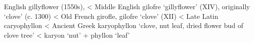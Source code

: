


\begin{etymology}
English gillyflower (1550s),
< Middle English gilofre `gillyflower' (XIV), originally `clove' (c. 1300)
< Old French girofle, gilofre `clove' (XII)
< Late Latin caryophyllon
< Ancient Greek karyophyllon `clove, nut leaf, dried flower bud of clove tree' 
< karyon `nut' + phyllon `leaf'
\end{etymology}






